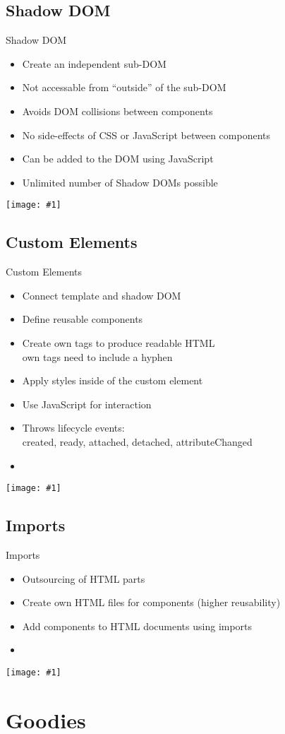 \documentclass{beamer}
\newcommand{\listing}[1]{
	\begin{itemize}
		\item[]
	\end{itemize}
}
\newcommand{\myfig}[2]{
	\begin{minipage}[c]{\textwidth}
		\begin{center}
			\texttt{[image: \#1]}
		\end{center}
		\vspace{3mm}
	\end{minipage}
}
\newcommand{\slideItems}[1]{
	\begin{itemize}
		#1
	\end{itemize}
}
\newcommand{\slide}[2]{
	\begin{frame}{#1}
		#2
	\end{frame}
}
\begin{document}
\subsection{Shadow DOM}

\slide{Shadow DOM}{
	\slideItems{
		\item Create an independent sub-DOM
		\item Not accessable from ``outside'' of the sub-DOM
		\item Avoids DOM collisions between components
		\item No side-effects of CSS or JavaScript between components
		\item Can be added to the DOM using JavaScript
		\item Unlimited number of Shadow DOMs possible
	}
	\myfig{shadow_dom.png}{.6}
}

\subsection{Custom Elements}

\slide{Custom Elements}{
	\slideItems{
		\item Connect template and shadow DOM
		\item Define reusable components
		\item Create own tags to produce readable HTML \\ \ding{213} own tags need to include a hyphen
		\item Apply styles inside of the custom element
		\item Use JavaScript for interaction
		\item Throws lifecycle events: \\ \ding{213} created, ready, attached, detached, attributeChanged
	}
	\listing{custom_element.html}
	\myfig{custom_element.png}{.5}
}

\subsection{Imports}

\slide{Imports}{
	\slideItems{
		\item Outsourcing of HTML parts
		\item Create own HTML files for components (higher reusability)
		\item Add components to HTML documents using imports
	}
	\listing{import.html}
	\myfig{import.png}{.5}
}

\section{Goodies}
\end{document}

